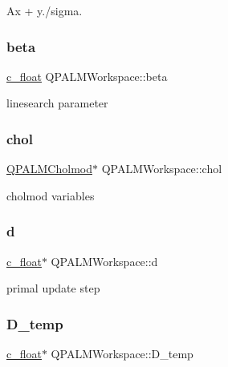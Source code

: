 Ax + y./sigma. 

\mbox{\label{structQPALMWorkspace_a68ed6544f86dc7a29a5f7c2fe26ffccc}} 
\subsubsection{\texorpdfstring{beta}{beta}}
{\footnotesize\ttfamily \mbox{\hyperlink{global__opts_8h_a7f1a9fda95e52979658c20a0d134fb15}{c\+\_\+float}} Q\+P\+A\+L\+M\+Workspace\+::beta}



linesearch parameter 

\mbox{\label{structQPALMWorkspace_ad848957a0173251709fb56804f6ef10e}} 
\subsubsection{\texorpdfstring{chol}{chol}}
{\footnotesize\ttfamily \mbox{\hyperlink{structQPALMCholmod}{Q\+P\+A\+L\+M\+Cholmod}}$\ast$ Q\+P\+A\+L\+M\+Workspace\+::chol}



cholmod variables 

\mbox{\label{structQPALMWorkspace_afa68534735d876db13ce5deab9f1e953}} 
\subsubsection{\texorpdfstring{d}{d}}
{\footnotesize\ttfamily \mbox{\hyperlink{global__opts_8h_a7f1a9fda95e52979658c20a0d134fb15}{c\+\_\+float}}$\ast$ Q\+P\+A\+L\+M\+Workspace\+::d}



primal update step 

\mbox{\label{structQPALMWorkspace_a2bc2197cd4f371383a791f58b11af6d2}} 
\subsubsection{\texorpdfstring{D\_temp}{D\_temp}}
{\footnotesize\ttfamily \mbox{\hyperlink{global__opts_8h_a7f1a9fda95e52979658c20a0d134fb15}{c\+\_\+float}}$\ast$ Q\+P\+A\+L\+M\+Workspace\+::\+D\+\_\+temp}




